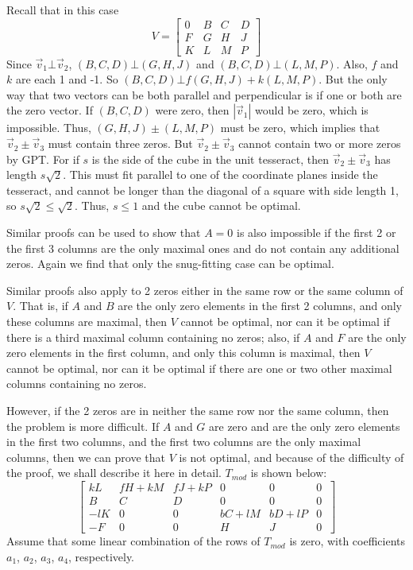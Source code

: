 Recall that in this case
\begin{equation*}
V = 
\begin{bmatrix}
0 & B & C & D \\
F & G & H & J \\
K & L & M & P
\end{bmatrix}
\end{equation*}
Since $\vec{v}_1 \bot \vec{v}_2$, $(B,C,D) \bot (G,H,J)$ and $(B,C,D) \bot
\label{refpage26}
(L,M,P)$.  Also, $f$ and $k$ are each 1 and -1.  So $(B,C,D) \bot f(G,H,J) +
k(L,M,P)$.  But the only way that two vectors can be both parallel and
perpendicular is if one or both are the zero vector.  If $(B,C,D)$ were zero,
then $|\vec{v}_1|$ would be zero, which is impossible.  Thus, $(G,H,J) \pm
(L,M,P)$ must be zero, which implies that $\vec{v}_2 \pm \vec{v}_3$ must
contain three zeros.  But $\vec{v}_2 \pm \vec{v}_3$ cannot contain two or more
zeros by GPT.  For if $s$ is the side of the cube in the unit tesseract, then
$\vec{v}_2 \pm \vec{v}_3$ has length $s\sqrt{2}$.  This must fit parallel to
one of the coordinate planes inside the tesseract, and cannot be longer than
the diagonal of a square with side length 1, so $s\sqrt{2} \leq \sqrt{2}$.
Thus, $s \leq 1$ and the cube cannot be optimal.

Similar proofs can be used to show that $A = 0$ is also impossible if
\label{refpage6}
the first 2 or the first 3 columns are the only maximal ones and do not
contain any additional zeros. Again we find that only the snug-fitting
case can be optimal.

Similar proofs also apply to 2 zeros either in the same row or the
same column of $V$. That is, if $A$ and $B$ are the only zero elements in the
first 2 columns, and only these columns are maximal, then $V$ cannot be
optimal, nor can it be optimal if there is a third maximal column
containing no zeros; also, if $A$ and $F$ are the only zero elements in the
first column, and only this column is maximal, then $V$ cannot be optimal, nor
can it be optimal if there are one or two other maximal columns
containing no zeros.

However, if the 2 zeros are in neither the same row nor the same
column, then the problem is more difficult. If $A$ and $G$ are zero and are the
only zero elements in the first two columns, and the first two columns
are the only maximal columns, then we can prove that $V$ is not optimal,
and because of the difficulty of the proof, we shall describe it here in
detail. $T_{mod}$ is shown below:
\begin{equation*}
\begin{bmatrix}
 kL & fH+kM & fJ+kP &  0    &  0    & 0~ \\
  B &  C    &  D    &  0    &  0    & 0~ \\
-lK &  0    &  0    & bC+lM & bD+lP & 0~ \\
 -F &  0    &  0    &  H    &  J    & 0~
\end{bmatrix}
\end{equation*}
Assume that some linear combination of the rows of $T_{mod}$ is zero, with
coefficients $a_1$, $a_2$, $a_3$, $a_4$, respectively.

